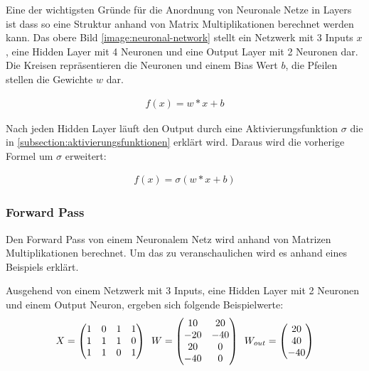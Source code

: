 
Eine der wichtigsten Gründe für die Anordnung von Neuronale Netze in Layers ist dass so eine Struktur anhand von Matrix Multiplikationen
berechnet werden kann. Das obere Bild \ref{image:neuronal-network} stellt ein Netzwerk mit 3 Inputs $ x $, eine Hidden Layer mit 4 Neuronen
und eine Output Layer mit 2
Neuronen dar. Die Kreisen repräsentieren die Neuronen und einem Bias Wert $ b $, die Pfeilen stellen die Gewichte $ w $ dar.

\begin{align}
  f(x) = w*x + b
\end{align}

Nach jeden Hidden Layer läuft den Output durch eine Aktivierungsfunktion $ \sigma $ die in \ref{subsection:aktivierungsfunktionen} erklärt wird.
Daraus wird die vorherige Formel um $ \sigma $ erweitert:

\begin{align}
  f(x) = \sigma( w*x + b)
\end{align}

\subsubsection{Forward Pass}
Den Forward Pass von einem Neuronalem Netz wird anhand von Matrizen Multiplikationen berechnet. Um das zu veranschaulichen wird
es anhand eines Beispiels erklärt.

Ausgehend von einem Netzwerk mit 3 Inputs, eine Hidden Layer mit 2 Neuronen und einem Output Neuron, ergeben sich folgende Beispielwerte:
\begin{equation} 
  \vspace{5pt}
  X = \begin{pmatrix}
    1 &0 &1 &1 \\
    1 &1 &1 &0 \\
    1 &1 &0 &1
  \end{pmatrix} 
  \hspace{5pt}
  W = \begin{pmatrix}
    10 &20 \\
    -20 &-40 \\
    20 &0 \\
    -40 &0
  \end{pmatrix}
  \hspace{5pt}
  W_{out} = \begin{pmatrix}
    20 \\
    40 \\
    -40
  \end{pmatrix}
\end{equation}

